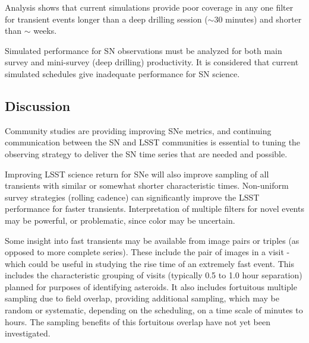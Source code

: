 Analysis shows that current simulations provide  poor coverage in any one filter for transient events longer than a deep drilling session ($\sim$30 minutes) and shorter than $\sim$ weeks.

Simulated performance for SN observations must be analyzed for both main survey and mini-survey (deep drilling) productivity.  It is considered that current simulated schedules give inadequate performance for SN science.




\subsection{Discussion}
\label{sec:\secname:discussion}

Community studies are providing improving SNe metrics, and continuing communication between the SN and LSST communities is essential to tuning the observing strategy to deliver the SN time series that are needed and possible.

Improving LSST science return for SNe will also improve sampling of all transients with similar or somewhat shorter characteristic times.  Non-uniform survey strategies (rolling cadence) can significantly improve the LSST performance for faster transients.  Interpretation of multiple filters for novel events may be powerful, or problematic, since color may be uncertain.

Some insight into fast transients may be available from image pairs  or triples (as opposed to more complete series).  These include the pair of images in a visit - which could be useful in studying the rise time of an extremely fast event.  This includes the characteristic grouping of visits (typically 0.5 to 1.0 hour separation) planned for purposes of identifying asteroids.  It also includes fortuitous multiple sampling due to field overlap, providing additional sampling, which may be random or systematic, depending on the scheduling, on a time scale of minutes to hours.  The sampling benefits of this fortuitous overlap have not yet been investigated.





\navigationbar
